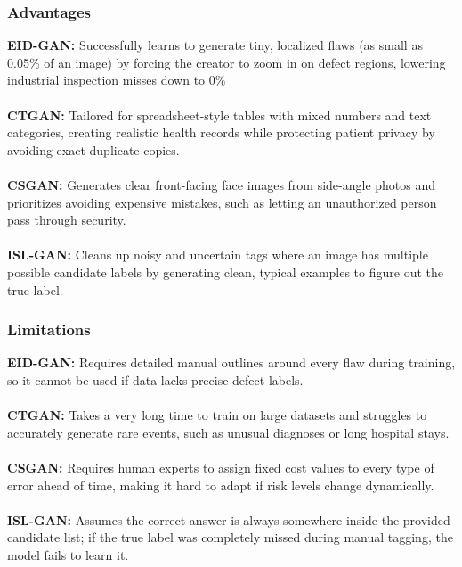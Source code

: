 \documentclass[12pt,a4paper]{article}
\begin{document}
\subsubsection{Advantages}
\textbf{EID-GAN:} Successfully learns to generate tiny, localized flaws (as small as 0.05\% of an image) by forcing the creator to zoom in on defect regions, lowering industrial inspection misses down to 0\% \\
\\ \textbf{CTGAN:} Tailored for spreadsheet-style tables with mixed numbers and text categories, creating realistic health records while protecting patient privacy by avoiding exact duplicate copies. \\
\\ \textbf{CSGAN:} Generates clear front-facing face images from side-angle photos and prioritizes avoiding expensive mistakes, such as letting an unauthorized person pass through security. \\
\\ \textbf{ISL-GAN:} Cleans up noisy and uncertain tags where an image has multiple possible candidate labels by generating clean, typical examples to figure out the true label.

\subsubsection{Limitations}
\textbf{EID-GAN:} Requires detailed manual outlines around every flaw during training, so it cannot be used if data lacks precise defect labels. \\
\\ \textbf{CTGAN:} Takes a very long time to train on large datasets and struggles to accurately generate rare events, such as unusual diagnoses or long hospital stays. \\
\\ \textbf{CSGAN:} Requires human experts to assign fixed cost values to every type of error ahead of time, making it hard to adapt if risk levels change dynamically. \\
\\ \textbf{ISL-GAN:} Assumes the correct answer is always somewhere inside the provided candidate list; if the true label was completely missed during manual tagging, the model fails to learn it.




\end{document}
